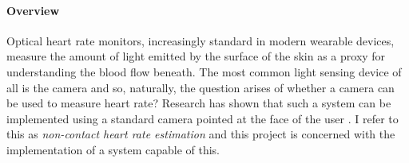 \paragraph{Overview}
Optical heart rate monitors, increasingly standard in modern wearable devices, measure the amount of light emitted by the surface of the 
skin as a proxy for understanding the blood flow beneath.
The most common light sensing device of all is the camera and so, naturally, the question arises of whether a camera can be used to measure heart rate?
Research has shown that such a system can be implemented using a standard camera pointed at the face of the user \cite{poh2010non}\cite{vanderKooij2019}\cite{Verkruysse2008}. I refer to this as \textit{non-contact heart rate estimation} and this project is concerned with the implementation of a system capable of this.  

